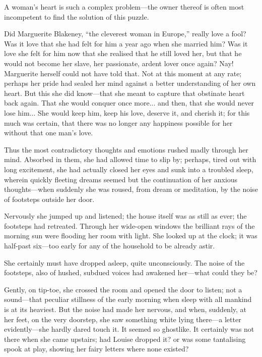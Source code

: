 A woman's heart is such a complex problem---the owner thereof is often most incompetent to find the solution of this puzzle.

Did Marguerite Blakeney, \enquote{the cleverest woman in Europe,} really love a fool? Was it love that she had felt for him a year ago when she married him? Was it love she felt for him now that she realised that he still loved her, but that he would not become her slave, her passionate, ardent lover once again? Nay! Marguerite herself could not have told that. Not at this moment at any rate; perhaps her pride had sealed her mind against a better understanding of her own heart. But this she did know---that she meant to capture that obstinate heart back again. That she would conquer once more... and then, that she would never lose him... She would keep him, keep his love, deserve it, and cherish it; for this much was certain, that there was no longer any happiness possible for her without that one man's love.

Thus the most contradictory thoughts and emotions rushed madly through her mind. Absorbed in them, she had allowed time to slip by; perhaps, tired out with long excitement, she had actually closed her eyes and sunk into a troubled sleep, wherein quickly fleeting dreams seemed but the continuation of her anxious  thoughts---when suddenly she was roused, from dream or meditation, by the noise of footsteps outside her door.

Nervously she jumped up and listened; the house itself was as still as ever; the footsteps had retreated. Through her wide-open windows the brilliant rays of the morning sun were flooding her room with light. She looked up at the clock; it was half-past six---too early for any of the household to be already astir.

She certainly must have dropped asleep, quite unconsciously. The noise of the footsteps, also of hushed, subdued voices had awakened her---what could they be?

Gently, on tip-toe, she crossed the room and opened the door to listen; not a sound---that peculiar stillness of the early morning when sleep with all mankind is at its heaviest. But the noise had made her nervous, and when, suddenly, at her feet, on the very doorstep, she saw something white lying there---a letter evidently---she hardly dared touch it. It seemed so ghostlike. It certainly was not there when she came upstairs; had Louise dropped it? or was some tantalising spook at play, showing her fairy letters where none existed?

